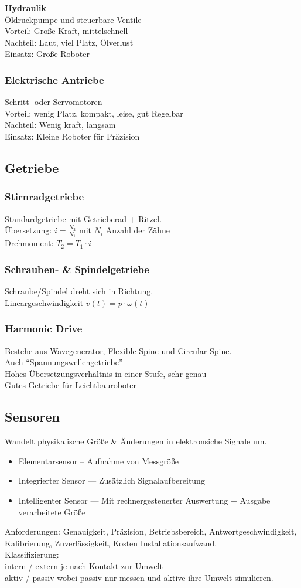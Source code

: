 \textbf{Hydraulik}\\
Öldruckpumpe und steuerbare Ventile\\
Vorteil: Große Kraft, mittelschnell\\
Nachteil: Laut, viel Platz, Ölverlust\\
Einsatz: Große Roboter

\subsubsection{Elektrische Antriebe}
Schritt- oder Servomotoren\\
Vorteil: wenig Platz, kompakt, leise, gut Regelbar\\
Nachteil: Wenig kraft, langsam\\
Einsatz: Kleine Roboter für Präzision

\subsection{Getriebe}
\subsubsection{Stirnradgetriebe}
Standardgetriebe mit Getrieberad + Ritzel.\\
Übersetzung: \(i = \frac{N_2}{N_1}\) mit \(N_i\) Anzahl der Zähne\\
Drehmoment: \(T_2 = T_1 \cdot i\)

\subsubsection{Schrauben- \& Spindelgetriebe}
Schraube/Spindel dreht sich in Richtung.\\
Lineargeschwindigkeit \(v(t) = p \cdot \omega(t)\)

\subsubsection{Harmonic Drive}
Bestehe aus Wavegenerator, Flexible Spine und Circular Spine.\\
Auch \enquote{Spannungswellengetriebe}\\
Hohes Übersetzungsverhältnis in einer Stufe, sehr genau\\
Gutes Getriebe für Leichtbauroboter

\subsection{Sensoren}
Wandelt physikalische Größe \& Änderungen in elektronsiche Signale um.
\begin{itemize}
\item Elementarsensor -- Aufnahme von Messgröße
\item Integrierter Sensor --- Zusätzlich Signalaufbereitung
\item Intelligenter Sensor --- Mit rechnergesteuerter Auswertung + Ausgabe verarbeitete Größe
\end{itemize}

Anforderungen: Genauigkeit, Präzision, Betriebsbereich, Antwortgeschwindigkeit, Kalibrierung, Zuverlässigkeit, Kosten
Installationsaufwand.\\

Klassifizierung:\\
intern / extern je nach Kontakt zur Umwelt\\
aktiv / passiv wobei passiv nur messen und aktive ihre Umwelt simulieren.